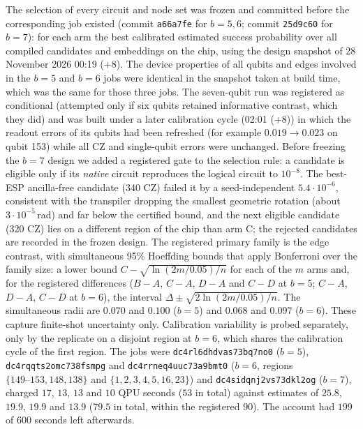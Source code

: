 \documentclass[11pt]{article}
\begin{document}
The selection of every circuit and node set was frozen and committed before the corresponding job existed (commit \texttt{a66a7fe} for $b=5,6$; commit \texttt{25d9c60} for $b=7$): for each arm the best calibrated estimated success probability over all compiled candidates and embeddings on the chip, using the design snapshot of 28 November 2026 00:19 ($+8$). The device properties of all qubits and edges involved in the $b=5$ and $b=6$ jobs were identical in the snapshot taken at build time, which was the same for those three jobs. The seven-qubit run was registered as conditional (attempted only if six qubits retained informative contrast, which they did) and was built under a later calibration cycle (02:01 ($+8$)) in which the readout errors of its qubits had been refreshed (for example $0.019\to0.023$ on qubit 153) while all CZ and single-qubit errors were unchanged. Before freezing the $b=7$ design we added a registered gate to the selection rule: a candidate is eligible only if its \emph{native} circuit reproduces the logical circuit to $10^{-8}$. The best-ESP ancilla-free candidate (340 CZ) failed it by a seed-independent $5.4\cdot10^{-6}$, consistent with the transpiler dropping the smallest geometric rotation (about $3\cdot10^{-5}$\,rad) and far below the certified bound, and the next eligible candidate (320 CZ) lies on a different region of the chip than arm C; the rejected candidates are recorded in the frozen design. The registered primary family is the edge contrast, with simultaneous 95\% Hoeffding bounds that apply Bonferroni over the family size: a lower bound $C-\sqrt{\ln(2m/0.05)/n}$ for each of the $m$ arms and, for the registered differences ($B-A$, $C-A$, $D-A$ and $C-D$ at $b=5$; $C-A$, $D-A$, $C-D$ at $b=6$), the interval $\Delta\pm\sqrt{2\ln(2m/0.05)/n}$. The simultaneous radii are $0.070$ and $0.100$ ($b=5$) and $0.068$ and $0.097$ ($b=6$). These capture finite-shot uncertainty only. Calibration variability is probed separately, only by the replicate on a disjoint region at $b=6$, which shares the calibration cycle of the first region. The jobs were \texttt{dc4rl6dhdvas73bq7no0} ($b=5$), \texttt{dc4rqqts2omc738fsmpg} and \texttt{dc4rrneq4uuc73a9bmt0} ($b=6$, regions $\{149\text{--}153,148,138\}$ and $\{1,2,3,4,5,16,23\}$) and \texttt{dc4sidqnj2vs73dkl2og} ($b=7$), charged $17$, $13$, $13$ and $10$ QPU seconds ($53$ in total) against estimates of $25.8$, $19.9$, $19.9$ and $13.9$ ($79.5$ in total, within the registered $90$). The account had $199$ of $600$ seconds left afterwards.
\end{document}
